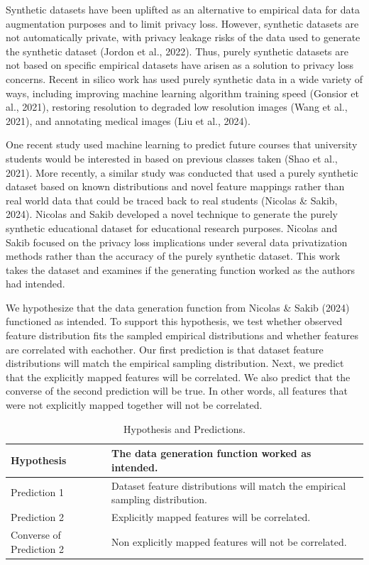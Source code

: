 \documentclass{article}
\begin{document}
Synthetic datasets have been uplifted as an alternative to empirical data for data augmentation purposes and to limit privacy loss. However, synthetic datasets are not automatically private, with privacy leakage risks of the data used to generate the synthetic dataset (Jordon et al., 2022). Thus, purely synthetic datasets are not based on specific empirical datasets have arisen as a solution to privacy loss concerns. Recent in silico work has used purely synthetic data in a wide variety of ways, including improving machine learning algorithm training speed (Gonsior et al., 2021), restoring resolution to degraded low resolution images (Wang et al., 2021), and annotating medical images (Liu et al., 2024).

One recent study used machine learning to predict future courses that university students would be interested in based on previous classes taken (Shao et al., 2021). More recently, a similar study was conducted that used a purely synthetic dataset based on known distributions and novel feature mappings rather than real world data that could be traced back to real students (Nicolas \& Sakib, 2024). Nicolas and Sakib developed a novel technique to generate the purely synthetic educational dataset for educational research purposes. Nicolas and Sakib focused on the privacy loss implications under several data privatization methods rather than the accuracy of the purely synthetic dataset. This work takes the dataset and examines if the generating function worked as the authors had intended.

We hypothesize that the data generation function from Nicolas \& Sakib (2024) functioned as intended. To support this hypothesis, we test whether observed feature distribution fits the sampled empirical distributions and whether features are correlated with eachother. Our first prediction is that dataset feature distributions will match the empirical sampling distribution. Next, we predict that the explicitly mapped features will be correlated. We also predict that the converse of the second prediction will be true. In other words, all features that were not explicitly mapped together will not be correlated.

\begin{table}[htbp]
  \centering
  \begin{tabular}{|l|l|}
    \hline
    Hypothesis & The data generation function worked as intended. \\ \hline
    Prediction 1 & Dataset feature distributions will match the empirical sampling distribution. \\ \hline
    Prediction 2 & Explicitly mapped features will be correlated. \\ \hline
    Converse of Prediction 2 & Non explicitly mapped features will not be correlated. \\ \hline
  \end{tabular}
  \caption{Hypothesis and Predictions.}
  \label{tab:hypothesis_predictions}
\end{table}
\end{document}

